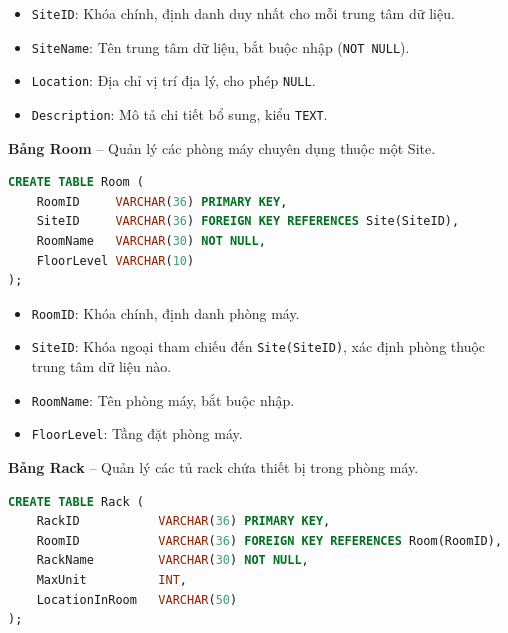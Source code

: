 \begin{itemize}[leftmargin=2em]
    \item \texttt{SiteID}: Khóa chính, định danh duy nhất cho mỗi trung tâm dữ liệu.
    \item \texttt{SiteName}: Tên trung tâm dữ liệu, bắt buộc nhập (\texttt{NOT NULL}).
    \item \texttt{Location}: Địa chỉ vị trí địa lý, cho phép \texttt{NULL}.
    \item \texttt{Description}: Mô tả chi tiết bổ sung, kiểu \texttt{TEXT}.
\end{itemize}

\vspace{0.5em}
\noindent\textbf{Bảng Room} -- Quản lý các phòng máy chuyên dụng thuộc một Site.

\begin{tcolorbox}[colback=gray!5, colframe=gray!60, title={\textbf{CREATE TABLE Room}}, fonttitle=\bfseries\small, boxrule=0.5pt, arc=2pt]
\begin{lstlisting}[language=SQL, basicstyle=\ttfamily\small, breaklines=true, showstringspaces=false, keywordstyle=\bfseries\color{blue!70!black}, stringstyle=\color{red!70!black}, commentstyle=\itshape\color{green!50!black}]
CREATE TABLE Room (
    RoomID     VARCHAR(36) PRIMARY KEY,
    SiteID     VARCHAR(36) FOREIGN KEY REFERENCES Site(SiteID),
    RoomName   VARCHAR(30) NOT NULL,
    FloorLevel VARCHAR(10)
);
\end{lstlisting}
\end{tcolorbox}

\begin{itemize}[leftmargin=2em]
    \item \texttt{RoomID}: Khóa chính, định danh phòng máy.
    \item \texttt{SiteID}: Khóa ngoại tham chiếu đến \texttt{Site(SiteID)}, xác định phòng thuộc trung tâm dữ liệu nào.
    \item \texttt{RoomName}: Tên phòng máy, bắt buộc nhập.
    \item \texttt{FloorLevel}: Tầng đặt phòng máy.
\end{itemize}

\vspace{0.5em}
\noindent\textbf{Bảng Rack} -- Quản lý các tủ rack chứa thiết bị trong phòng máy.

\begin{tcolorbox}[colback=gray!5, colframe=gray!60, title={\textbf{CREATE TABLE Rack}}, fonttitle=\bfseries\small, boxrule=0.5pt, arc=2pt]
\begin{lstlisting}[language=SQL, basicstyle=\ttfamily\small, breaklines=true, showstringspaces=false, keywordstyle=\bfseries\color{blue!70!black}, stringstyle=\color{red!70!black}, commentstyle=\itshape\color{green!50!black}]
CREATE TABLE Rack (
    RackID           VARCHAR(36) PRIMARY KEY,
    RoomID           VARCHAR(36) FOREIGN KEY REFERENCES Room(RoomID),
    RackName         VARCHAR(30) NOT NULL,
    MaxUnit          INT,
    LocationInRoom   VARCHAR(50)
);
\end{lstlisting}
\end{tcolorbox}

